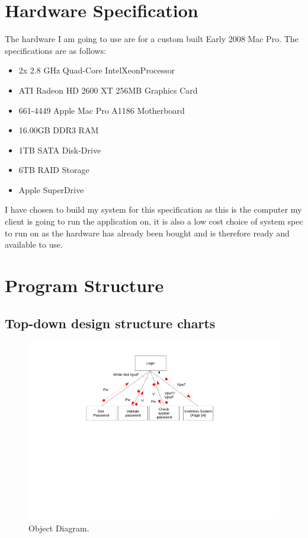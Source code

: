 \section{Hardware Specification}

The hardware I am going to use are for a custom built Early 2008 Mac Pro. The specifications are as follows:
\begin{itemize}
    \item 2x 2.8 GHz Quad-Core Intel\textregistered Xeon\texttrademark Processor
    \item ATI Radeon HD 2600 XT 256MB Graphics Card
    \item 661-4449 Apple Mac Pro A1186 Motherboard
    \item 16.00GB DDR3 RAM
    \item 1TB SATA Disk-Drive
    \item 6TB RAID Storage
    \item Apple SuperDrive \\
\end{itemize}

I have chosen to build my system for this specification as this is the computer my client is going to run the application on, it is also a low cost choice of system spec to run on as the hardware has already been bought and is therefore ready and available to use.

\section{Program Structure}

\begin{landscape}

    \subsection{Top-down design structure charts}

    \begin{figure}[H]
        \begin{center}
        \includegraphics[width=500px]{./Design/top_down_design/Top_down_design.pdf}
        \caption{Object Diagram.} \label{fig:object_diagram}
        \end{center}
    \end{figure}

\end{landscape}


